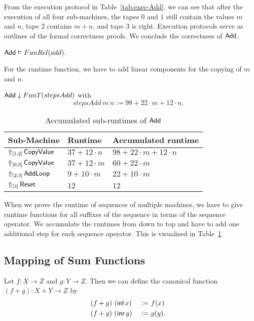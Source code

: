 From the execution protocol in Table~\ref{tab:exec-Add}, we can see that after the execution of all four sub-machines, the tapes $0$ and $1$ still
contain the values $m$ and $n$, tape $2$ contains $m+n$, and tape $3$ is right.  Execution protocols serve as outlines of the formal correctness
proofs.  We conclude the correctness of $\MS{Add}$.
\begin{lemma}
  \label{lem:Add_Computes}
  $\MS{Add} \Realise FunRel(add)$.
\end{lemma}

For the runtime function, we have to add linear components for the copying of $m$ and $n$.
\begin{lemma}
  $\MS{Add} \downarrow FunT(stepsAdd)$ with
  \[
    stepsAdd~m~n := 98 + 22 \cdot m + 12 \cdot n.
  \]
\end{lemma}

\begin{table}[h]
  \centering
  \begin{tabular}{|l|l|l|}
    \hline Sub-Machine & Runtime & Accumulated runtime \\ \hline\hline
    $\LiftTapes{\MS{CopyValue}}{\Vector{1;2}}$  & $37 + 12 \cdot n$ & $98 + 22 \cdot m + 12 \cdot n$ \\ \hline
    $\LiftTapes{\MS{CopyValue}}{\Vector{0;3}}$  & $37 + 12 \cdot m$ & $60 + 22 \cdot m$ \\ \hline
    $\LiftTapes{\MS{AddLoop}}{\Vector{2;3}}$    & $9 + 10 \cdot m$  & $22 + 10 \cdot m$ \\ \hline
    $\LiftTapes{\MS{Reset}}{\Vector{3}}$        & $12$              & $12$ \\ \hline
  \end{tabular}
  \caption{Accumulated sub-runtimes of $\MS{Add}$}
  \label{tab:runtime-Add}
\end{table}

When we prove the runtime of sequences of multiple machines, we have to give runtime functions for all suffixes of the sequence in terms of the
sequence operator.  We accumulate the runtimes from down to top and have to add one additional step for each sequence operator.  This is visualised in
Table~\ref{tab:runtime-Add}.


\subsection{Mapping of Sum Functions}
\label{sec:SumTM}

Let $f : X \to Z$ and $g : Y \to Z$.  Then we can define the canonical function $(f+g) : X+Y \to Z$ by
\begin{alignat*}{2}
  (f+g)&~(\inl x)&~:=~& f(x) \\
  (f+g)&~(\inr y)&~:=~& g(y).
\end{alignat*}

